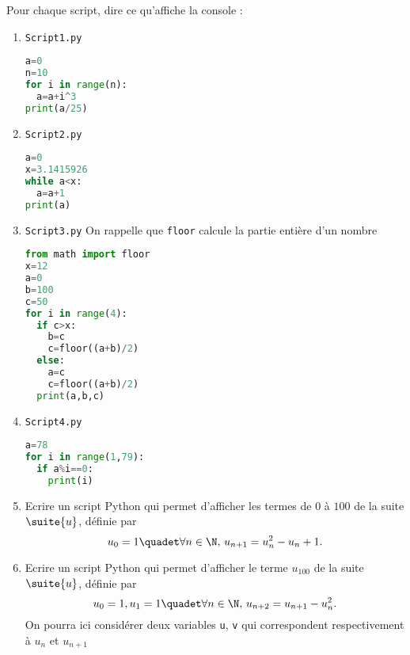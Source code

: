 \documentclass[a4paper, 11pt,reqno]{article}
\begin{document}
\begin{exercice}
Pour chaque script, dire ce qu'affiche la console : 


\begin{minipage}{0.45\textwidth}   %
\begin{enumerate}
\item  \texttt{Script1.py}

\begin{lstlisting}[language=Python]
a=0
n=10
for i in range(n):
  a=a+i^3
print(a/25)
\end{lstlisting}

\vspace{1cm}


\item \texttt{Script2.py}
\begin{lstlisting}[language=Python]
a=0
x=3.1415926
while a<x:
  a=a+1
print(a)
\end{lstlisting}



\vspace{1cm}


\end{enumerate}
\end{minipage}
\hfill\vline\hfill
\begin{minipage}{0.44\textwidth} %

\begin{enumerate} \setcounter{enumi}{2}
\vspace{0.4cm}
\item \texttt{Script3.py} On rappelle que \texttt{floor} calcule la partie entière d'un nombre
\begin{lstlisting}[language=Python]
from math import floor
x=12
a=0
b=100
c=50
for i in range(4):
  if c>x:
    b=c
    c=floor((a+b)/2)
  else:
    a=c
    c=floor((a+b)/2)
  print(a,b,c)
\end{lstlisting}
\vspace{0.4cm}
\item \texttt{Script4.py}
\begin{lstlisting}[language=Python]
a=78
for i in range(1,79):
  if a%i==0:
    print(i)
\end{lstlisting}


\end{enumerate}



\end{minipage}
\begin{enumerate}
 \setcounter{enumi}{4}
 \item Ecrire un script Python qui permet d'afficher les termes de $0$ à $100$ de la suite $\suite{u}$, définie par 
$$u_0= 1 \quadet \forall n \in\N,\, u_{n+1} =u_n^2-u_n+1.$$
 
 
 \item Ecrire un script Python qui permet d'afficher le  terme $u_{100}$ de la suite $\suite{u}$, définie par 
$$u_0= 1, u_1=1 \quadet \forall n \in\N,\, u_{n+2} =u_{n+1}-u_n^2.$$ 
On pourra ici considérer deux variables \texttt{u}, \texttt{v} qui correspondent respectivement à $u_n$ et $u_{n+1}$
\end{enumerate}


\end{exercice}
\end{document}
